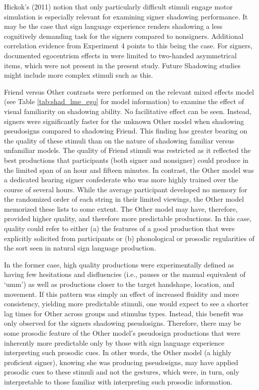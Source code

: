             Hickok’s (2011) notion that only particularly difficult stimuli engage motor simulation is especially relevant for examining signer shadowing performance. It may be the case that sign language experience renders shadowing a less cognitively demanding task for the signers compared to nonsigners. Additional correlation evidence from Experiment 4 points to this being the case. For signers, documented egocentrism effects in  were limited to two-handed asymmetrical items, which were not present in the present study. Future Shadowing studies might include more complex stimuli such as this.\par
            Friend versus Other contrasts were performed on the relevant mixed effects model (see Table \ref{tab:shad_lme_ego} for model information) to examine the effect of visual familiarity on shadowing ability. No facilitative effect can be seen. Instead, signers were significantly faster for the unknown Other model when shadowing pseudosigns compared to shadowing Friend. This finding has greater bearing on the quality of these stimuli than on the nature of shadowing familiar versus unfamiliar models. The quality of Friend stimuli was restricted as it reflected the best productions that participants (both signer and nonsigner) could produce in the limited span of an hour and fifteen minutes. In contrast, the Other model was a dedicated hearing signer confederate who was more highly trained over the course of several hours. While the average participant developed no memory for the randomized order of each string in their limited viewings, the Other model memorized these lists to some extent. The Other model may have, therefore, provided higher quality, and therefore more predictable productions. In this case, quality could refer to either (a) the features of a good production that were explicitly solicited from participants or (b) phonological or prosodic regularities of the sort seen in natural sign language production. \par
            In the former case, high quality productions were experimentally defined as having few hesitations and disfluencies (i.e., pauses or the manual equivalent of ‘umm’) as well as productions closer to the target handshape, location, and movement. If this pattern was simply an effect of increased fluidity and more consistency, yielding more predictable stimuli, one would expect to see a shorter lag times for Other across groups and stimulus types. Instead, this benefit was only observed for the signers shadowing pseudosigns. Therefore, there may be some prosodic feature of the Other model’s pseudosign productions that were inherently more predictable only by those with sign language experience interpreting such prosodic cues. In other words, the Other model (a highly proficient signer), knowing she was producing pseudosigns, may have applied prosodic cues to these stimuli and not the gestures, which were, in turn, only interpretable to those familiar with interpreting such prosodic information. \par
